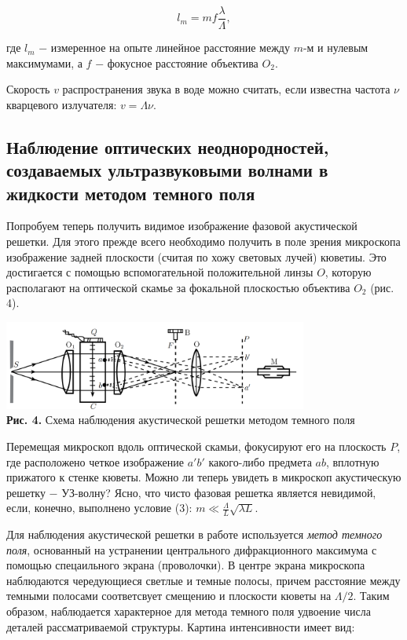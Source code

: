 \documentclass[a4paper,12pt]{article} %
\begin{document}
\begin{equation}\label{ linkname }
l_{m} = mf \frac{\lambda} {\Lambda},
\end{equation}

\hfill \break где $l_{m}$ $-$ измеренное на опыте линейное расстояние между $m$-м и нулевым максимумами, а $f$ $-$ фокусное расстояние объектива $O_{2}$.

\hfill \break Скорость $v$ распространения звука в воде можно считать, если известна частота $\nu$ кварцевого излучателя: $ v = \Lambda \nu $.

\subsection{Наблюдение оптических неоднородностей, создаваемых ультразвуковыми волнами в жидкости методом темного поля}
\hfill \break Попробуем теперь получить видимое изображение фазовой акустической решетки. Для этого прежде всего необходимо получить в поле зрения микроскопа изображение задней плоскости (считая по хожу световых лучей) кюветиы. Это достигается с помощью вспомогательной положительной линзы $O$, которую располагают на оптической скамье за фокальной плоскостью объектива $O_{2}$ (рис. 4).

\begin{center}
\includegraphics[width=0.75\textwidth]{4.3.2_4.png}\\
\textbf{Рис. 4.} Схема наблюдения акустической решетки методом темного поля \\
\end{center}

\hfill \break Перемещая микроскоп вдоль оптической скамьи, фокусируют его на плоскость $P$, где расположено четкое изображение $a'b'$ какого-либо предмета $ab$, вплотную прижатого к стенке кюветы. Можно ли теперь увидеть в микроскоп акустическую решетку $-$ УЗ-волну? Ясно, что чисто фазовая решетка является невидимой, если, конечно, выполнено условие (3): $m \ll \frac {\Lambda} {L} \sqrt{ {\lambda} {L} }$.

\hfill \break Для наблюдения акустической решетки в работе используется \textit{метод темного поля}, основанный на устранении центрального дифракционного максимума с помощью спецаильного экрана (проволочки). В центре экрана микроскопа наблюдаются чередующиеся светлые и темные полосы, причем расстояние между темными полосами соответсвует смещению и плоскости кюветы на $\Lambda/2$. Таким образом, наблюдается характерное для метода темного поля удвоение числа деталей рассматриваемой структуры. Картина интенсивности имеет вид:
\end{document}

